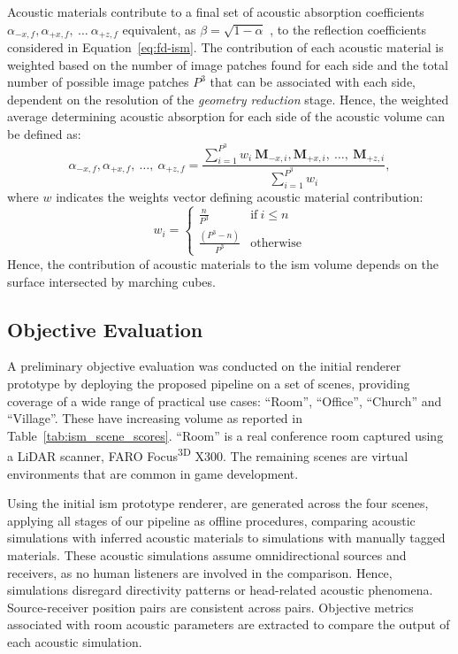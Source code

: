 Acoustic materials contribute to a final set of acoustic absorption coefficients $\alpha_{-x,f}, \alpha_{+x,f},~\dots~\alpha_{+z,f}$ equivalent, as $\beta = \sqrt{1 - \alpha}$ \citep{allen1979image}, to the reflection coefficients considered in Equation~\ref{eq:fd-ism}. The contribution of each acoustic material is weighted based on the number of image patches found for each side and the total number of possible image patches $P^3$ that can be associated with each side, dependent on the resolution of the \emph{geometry reduction} stage. Hence, the weighted average determining acoustic absorption for each side of the acoustic volume can be defined as: 
\begin{equation}
    \alpha_{-x,f}, \alpha_{+x,f},~\dots,~\alpha_{+z,f} = \frac{ \sum_{i=1}^{P^3} w_i~\mathbf{M}_{-x,i}, \mathbf{M}_{+x,i},~\dots,~\mathbf{M}_{+z,i} }{ \sum_{i = 1}^{P^3} w_i},
\label{eq:weighted_average}
\end{equation}
where $w$ indicates the weights vector defining acoustic material contribution: 
\begin{equation}
    w_i = \begin{cases}
        \frac{n}{P^3}& \text{if}~i \leq n \\
        \frac{(P^3 - n)}{P^3}& \text{otherwise}
    \end{cases}
\label{eq:patch_contribution}
\end{equation}
Hence, the contribution of acoustic materials to the \acrshort{ism} volume depends on the surface intersected by marching cubes.

\subsection{Objective Evaluation}
A preliminary objective evaluation was conducted on the initial renderer prototype by deploying the proposed pipeline on a set of scenes, providing coverage of a wide range of practical use cases: ``Room'', ``Office'', ``Church'' and ``Village''. These have increasing volume as reported in Table~\ref{tab:ism_scene_scores}. ``Room'' is a real conference room captured using a LiDAR scanner, FARO Focus\textsuperscript{3D} X300. The remaining scenes are virtual environments that are common in game development. \par
Using the initial \acrshort{ism} prototype renderer,  are generated across the four scenes, applying all stages of our pipeline as offline procedures, comparing acoustic simulations with inferred acoustic materials to simulations with manually tagged materials. These acoustic simulations assume omnidirectional sources and receivers, as no human listeners are involved in the comparison. Hence, simulations disregard directivity patterns or head-related acoustic phenomena. Source-receiver position pairs are consistent across  pairs. Objective metrics associated with room acoustic parameters are extracted to compare the output of each acoustic simulation.\par

